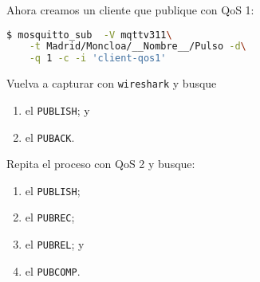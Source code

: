 \documentclass[xcolor={x11names}]{beamer}
\begin{document}
\begin{frame}[fragile]{\secname}
    Ahora creamos un cliente que publique
    con QoS 1:
\begin{lstlisting}[language=bash]
$ mosquitto_sub  -V mqttv311\
    -t Madrid/Moncloa/__Nombre__/Pulso -d\
    -q 1 -c -i 'client-qos1'
\end{lstlisting}
Vuelva a capturar con \texttt{wireshark} y busque
\begin{enumerate}
    \item el \texttt{PUBLISH}; y
    \item el \texttt{PUBACK}.
\end{enumerate}

Repita el proceso con QoS 2 y busque:
\begin{enumerate}
    \item el \texttt{PUBLISH};
    \item el \texttt{PUBREC}; 
    \item el \texttt{PUBREL}; y
    \item el \texttt{PUBCOMP}.
\end{enumerate}
\end{frame}
\end{document}
